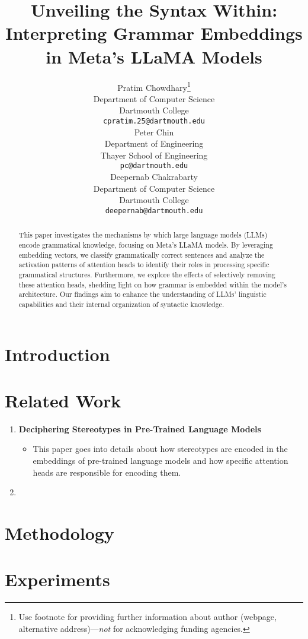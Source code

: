 \documentclass{article}
\title{Unveiling the Syntax Within: Interpreting Grammar Embeddings in Meta’s LLaMA Models}
\author{%
  Pratim Chowdhary\thanks{Use footnote for providing further information
    about author (webpage, alternative address)---\emph{not} for acknowledging
    funding agencies.} \\
  Department of Computer Science\\
  Dartmouth College\\
  \texttt{cpratim.25@dartmouth.edu} \\
  \And
  Peter Chin \\
  Department of Engineering\\
  Thayer School of Engineering\\
  \texttt{pc@dartmouth.edu} \\
  \And
  Deepernab Chakrabarty \\
  Department of Computer Science\\
  Dartmouth College\\
  \texttt{deepernab@dartmouth.edu} \\
}
\begin{document}
\maketitle


\begin{abstract}
  This paper investigates the mechanisms by which large language models (LLMs) encode 
  grammatical knowledge, focusing on Meta's LLaMA models. By leveraging embedding vectors, 
  we classify grammatically correct sentences and analyze the activation patterns of 
  attention heads to identify their roles in processing specific grammatical structures. 
  Furthermore, we explore the effects of selectively removing these attention heads, shedding 
  light on how grammar is embedded within the model's architecture. Our findings aim to enhance
  the understanding of LLMs' linguistic capabilities and their internal organization of syntactic knowledge.
\end{abstract}


\section{Introduction}

\section{Related Work}

\begin{enumerate}

  \item \textbf{Deciphering Stereotypes in Pre-Trained Language Models} 
  \begin{itemize}
    \item This paper goes into details about how stereotypes are encoded in the embeddings of pre-trained language models and how specific attention heads are responsible for encoding them.
  \end{itemize}
  \item \textbf{}

\end{enumerate}


\section{Methodology}


\section{Experiments}
\end{document}
